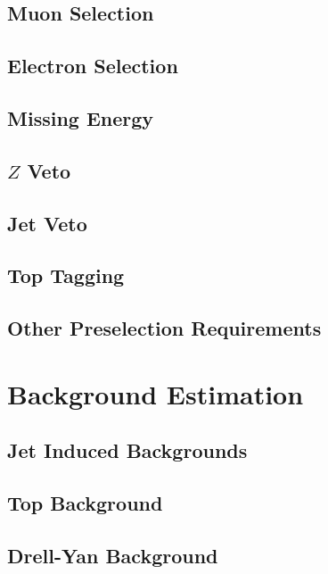 \documentclass{cmspaper}
\begin{document}
   \subsection{Muon Selection}
     \label{sec:sel_muons}
    
   \subsection{Electron Selection}
     \label{sec:sel_electrons}
     
   \subsection{Missing Energy}
     \label{sec:sel_met}
     
   \subsection{$Z$ Veto}
     \label{sec:sel_zveto}
     
   \subsection{Jet Veto}
     \label{sec:sel_jets}
     
  \subsection{Top Tagging}
     \label{sec:sel_toptag}
      
   \subsection{Other Preselection Requirements}
     \label{sec:sel_other}
     

\clearpage
\section{Background Estimation}
    \label{sec:backgrounds}
    
    \label{sec:bkg_intro}
  \subsection{Jet Induced Backgrounds}
    \label{sec:bkg_fakes}
    
  \subsection{Top Background}
    \label{sec:bkg_top}
    
  \subsection{Drell-Yan Background}
    \label{sec:bkg_dy}
    
\end{document}
